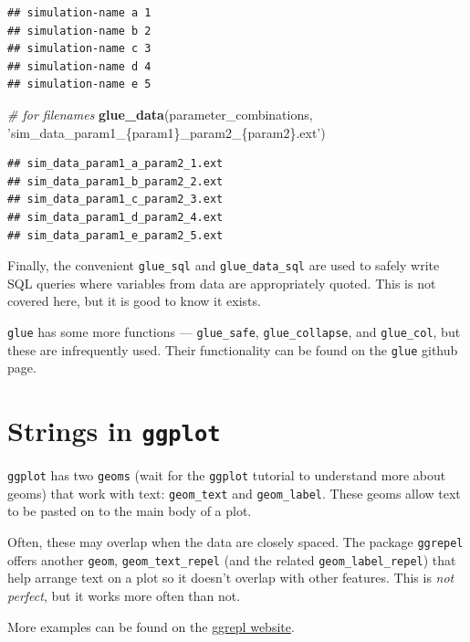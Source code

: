 \documentclass[]{book}
\newenvironment{Shaded}{}{}
\newcommand{\CommentTok}[1]{\textcolor[rgb]{0.38,0.63,0.69}{\textit{#1}}}
\newcommand{\KeywordTok}[1]{\textcolor[rgb]{0.00,0.44,0.13}{\textbf{#1}}}
\newcommand{\NormalTok}[1]{#1}
\newcommand{\StringTok}[1]{\textcolor[rgb]{0.25,0.44,0.63}{#1}}
\begin{document}
\begin{verbatim}
## simulation-name a 1
## simulation-name b 2
## simulation-name c 3
## simulation-name d 4
## simulation-name e 5
\end{verbatim}

\begin{Shaded}
\begin{Highlighting}[]
\CommentTok{# for filenames}
\KeywordTok{glue_data}\NormalTok{(parameter_combinations,}
          \StringTok{'sim_data_param1_\{param1\}_param2_\{param2\}.ext'}\NormalTok{)}
\end{Highlighting}
\end{Shaded}

\begin{verbatim}
## sim_data_param1_a_param2_1.ext
## sim_data_param1_b_param2_2.ext
## sim_data_param1_c_param2_3.ext
## sim_data_param1_d_param2_4.ext
## sim_data_param1_e_param2_5.ext
\end{verbatim}

Finally, the convenient \texttt{glue\_sql} and \texttt{glue\_data\_sql} are used to safely write SQL queries where variables from data are appropriately quoted. This is not covered here, but it is good to know it exists.

\texttt{glue} has some more functions --- \texttt{glue\_safe}, \texttt{glue\_collapse}, and \texttt{glue\_col}, but these are infrequently used. Their functionality can be found on the \texttt{glue} github page.

\hypertarget{strings-in-ggplot}{%
\section{\texorpdfstring{Strings in \texttt{ggplot}}{Strings in ggplot}}\label{strings-in-ggplot}}

\texttt{ggplot} has two \texttt{geoms} (wait for the \texttt{ggplot} tutorial to understand more about geoms) that work with text: \texttt{geom\_text} and \texttt{geom\_label}. These geoms allow text to be pasted on to the main body of a plot.

Often, these may overlap when the data are closely spaced. The package \texttt{ggrepel} offers another \texttt{geom}, \texttt{geom\_text\_repel} (and the related \texttt{geom\_label\_repel}) that help arrange text on a plot so it doesn't overlap with other features. This is \emph{not perfect}, but it works more often than not.

More examples can be found on the \href{https://github.com/slowkow/ggrepel}{ggrepl website}.
\end{document}
